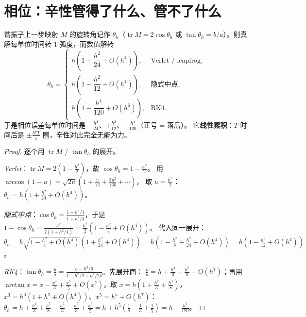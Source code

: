 \section{相位：辛性管得了什么、管不了什么}
\label{sec:phase}

\begin{theorem}[三种方法的相位误差率]
\label{thm:phase}
谐振子上一步映射 $M$ 的旋转角记作 $\theta_h$（$\operatorname{tr}M=2\cos\theta_h$ 或
$\tan\theta_h=b/a$）。则真解每单位时间转 $1$ 弧度，而数值解转
\begin{equation}
  \theta_h=
  \begin{cases}
    h\left(1+\dfrac{h^2}{24}+O(h^4)\right), & \text{Verlet / leapfrog},\\[6pt]
    h\left(1-\dfrac{h^2}{12}+O(h^4)\right), & \text{隐式中点},\\[6pt]
    h\left(1-\dfrac{h^4}{120}+O(h^6)\right), & \text{RK4}.
  \end{cases}
  \label{eq:phase}
\end{equation}
于是相位误差每单位时间是 $-\tfrac{h^2}{24}$、$+\tfrac{h^2}{12}$、$+\tfrac{h^4}{120}$（正号 = 落后）。
它\textbf{线性累积}：$T$ 时间后是 $\pm\tfrac{h^pT}{c}$ 圈，辛性对此完全无能为力。
\end{theorem}

\begin{proof}
逐个用 $\operatorname{tr}M$ / $\tan\theta_h$ 的展开。

\emph{Verlet}：$\operatorname{tr}M=2(1-\tfrac{h^2}{2})$，故 $\cos\theta_h=1-\tfrac{h^2}{2}$。
用 $\arccos(1-u)=\sqrt{2u}\left(1+\tfrac{u}{12}+\tfrac{3u^2}{160}+\cdots\right)$，
取 $u=\tfrac{h^2}{2}$：$\theta_h=h\left(1+\tfrac{h^2}{24}+O(h^4)\right)$。

\emph{隐式中点}：$\cos\theta_h=\tfrac{1-h^2/4}{1+h^2/4}$，于是
$1-\cos\theta_h=\tfrac{h^2}{2(1+h^2/4)}=\tfrac{h^2}{2}\left(1-\tfrac{h^2}{4}+O(h^4)\right)$。
代入同一展开：$\theta_h=h\sqrt{1-\tfrac{h^2}{4}+O(h^4)}\left(1+\tfrac{h^2}{24}+O(h^4)\right)
=h\left(1-\tfrac{h^2}{8}+\tfrac{h^2}{24}+O(h^4)\right)=h\left(1-\tfrac{h^2}{12}+O(h^4)\right)$。

\emph{RK4}：$\tan\theta_h=\tfrac ba=\tfrac{h-h^3/6}{1-h^2/2+h^4/24}$。先展开商：
$\tfrac ba=h+\tfrac{h^3}{3}+\tfrac{h^5}{8}+O(h^7)$；再用
$\arctan x=x-\tfrac{x^3}{3}+\tfrac{x^5}{5}+O(x^7)$，取 $x=h(1+\tfrac{h^2}{3}+\tfrac{h^4}{8})$，
$x^3=h^3(1+h^2+O(h^4))$、$x^5=h^5+O(h^7)$：
$\theta_h=h+\tfrac{h^3}{3}+\tfrac{h^5}{8}-\tfrac{h^3}{3}-\tfrac{h^5}{3}+\tfrac{h^5}{5}
=h+h^5\left(\tfrac18-\tfrac13+\tfrac15\right)=h-\tfrac{h^5}{120}$。
\end{proof}

